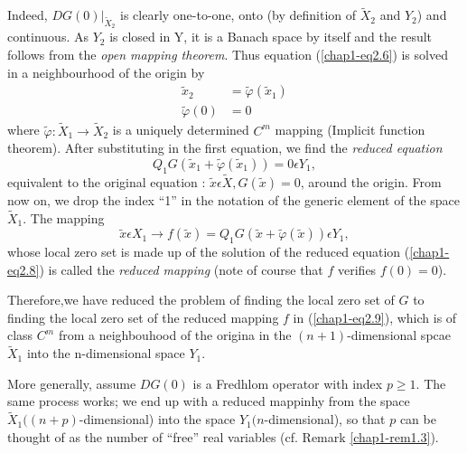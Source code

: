 Indeed, $DG(0) |_{\widetilde{X}_{2}}$ is clearly one-to-one, onto (by definition of $\widetilde{X}_{2}$ and $Y_{2}$) and continuous. As $Y_{2}$ is closed in Y, it is a Banach space by itself and the result follows from the {\em open mapping theorem}. Thus equation (\ref{chap1-eq2.6}) is solved in a neighbourhood of the origin by
\begin{align*}
\widetilde{x}_{2} & = \widetilde{\varphi}(\widetilde{x}_{1})\\
\widetilde{\varphi}(0) & = 0
\end{align*}
where $\widetilde{\varphi} : \widetilde{X}_{1} \to \widetilde{X}_{2}$ is a uniquely determined $C^{m}$ mapping (Implicit function theorem). After substituting in the first equation, we find the {\em reduced equation}
\begin{equation*}
Q_{1} G(\widetilde{x}_{1} + \widetilde{\varphi}(\widetilde{x}_{1})) = 0 \epsilon Y_{1},\tag{2.8}\label{chap1-eq2.8}
\end{equation*}
equivalent to the original equation : $\widetilde{x} \epsilon \widetilde{X}, G(\widetilde{x}) = 0$, around the origin. From now on, we drop the index ``1'' in the notation of the generic element of the space $\widetilde{X}_{1}$. The mapping
\begin{equation*}
\widetilde{x} \epsilon X_{1} \to f(\widetilde{x}) = Q_{1}G(\widetilde{x} + \widetilde{\varphi}(\widetilde{x})) \epsilon Y_{1},\tag{2.9}\label{chap1-eq2.9}
\end{equation*}
whose local zero set is made up of the solution of the reduced equation (\ref{chap1-eq2.8}) is called the {\em reduced mapping}
(note of course that $f$ verifies $f(0) = 0$).

Therefore,\pageoriginale we have reduced the problem of finding the local zero set of $G$ to finding the local zero set of the reduced mapping $f$ in (\ref{chap1-eq2.9}), which is of class $C^{m}$ from a neighbouhood of the origina in the $(n+1)$-dimensional spcae $\widetilde{X}_{1}$ into the n-dimensional space $Y_{1}$.

\begin{remark}\label{chap1-rem2.2}
More generally, assume $DG(0)$ is a Fredhlom operator with index $p \geq 1$. The same process works; we end up with a reduced mappinhy from the space $\widetilde{X}_{1} ((n+p)$-dimensional) into the space $Y_{1}(n$-dimensional), so that $p$ can be thought of as the number of ``free'' real variables (cf. Remark \ref{chap1-rem1.3}).
\end{remark}

